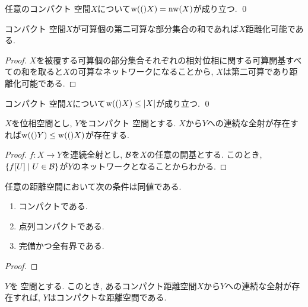 \documentclass[uplatex, dvipdfmx, a4paper, 12pt, class=jsbook, crop=false]{standalone}
\begin{document}
\begin{corollary}
	\label{coro:Weight in a compact Hausdorff space is equal to network weight}
	任意のコンパクト  空間$ X $について$ \topweight(X) = \topnetwork(X) $が成り立つ.
	\qed
\end{corollary}

\begin{corollary}
	コンパクト  空間$ X $が可算個の第二可算な部分集合の和であれば$ X $距離化可能である.
\end{corollary}

\begin{proof}
	$ X $を被覆する可算個の部分集合それぞれの相対位相に関する可算開基すべての和を取ると$ X $の可算なネットワークになることから, $ X $は第二可算であり距離化可能である.
\end{proof}

\begin{corollary}
	コンパクト  空間$ X $について$ \topweight(X) \leq \cardinality{X} $が成り立つ.
	\qed
\end{corollary}

\begin{corollary}
	$ X $を位相空間とし, $ Y $をコンパクト  空間とする.
	$ X $から$ Y $への連続な全射が存在すれば$ \topweight(Y) \leq \topweight(X) $が存在する.
\end{corollary}

\begin{proof}
	$ f \colon X \to Y $を連続全射とし, $ \mathcal{B} $を$ X $の任意の開基とする.
	このとき, $ \setcomp{f[U]}{U \in \topbasis} $が$ Y $のネットワークとなることからわかる.
\end{proof}

\begin{proposition}
	任意の距離空間において次の条件は同値である.
	\begin{enumerate}
		\item コンパクトである.
		\item 点列コンパクトである.
		\item 完備かつ全有界である.
	\end{enumerate}
\end{proposition}

\begin{proof}
	\WIP
\end{proof}

\begin{proposition}
	$ Y $を \Hausdorff 空間とする.
	このとき, あるコンパクト距離空間$ X $から$ Y $への連続な全射が存在すれば, $ Y $はコンパクトな距離空間である.
\end{proposition}
\end{document}
